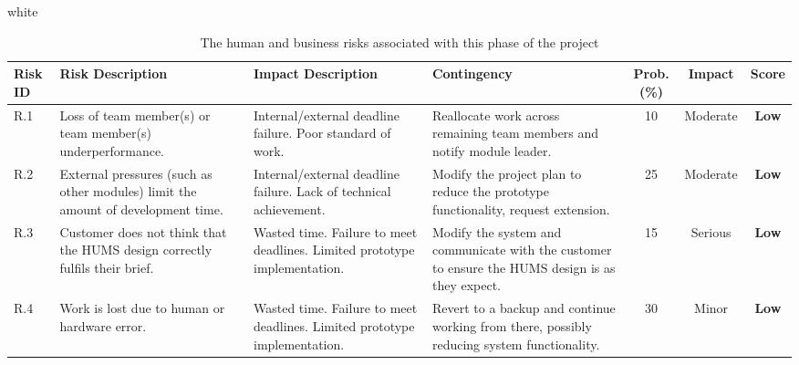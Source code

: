 \documentclass[10pt,a4paper]{article}
\newcommand{\tableformat}[4]{
\begin{table}[H]
\centering
  \rowcolors{2}{gray!10} {white}
\begin{tabular}{#1}
  \hline
  \rowcolor[gray]{0.9} #2
\end{tabular}
\caption{#3}
\label{#4}
\end{table}}
\begin{document}
\tableformat{p{0.8cm} p{3cm} p{3cm} p{3cm} c c c }
{ 	\hline
  	Risk ID & Risk Description & Impact Description & Contingency & Prob.(\%) & Impact & Score \\
  	\hline
  
 	R.1 & Loss of team member(s) or team member(s) underperformance. & Internal/external deadline failure. Poor standard of work. & Reallocate work across remaining team members and notify module leader. & 10 & Moderate & \textbf{Low} \\
   	R.2 & External pressures (such as other modules) limit the amount of development time. & Internal/external deadline failure. Lack of technical achievement. & Modify the project plan to reduce the prototype functionality, request extension. & 25 & Moderate &  \textbf{Low} \\
   	R.3 & Customer does not think that the HUMS design correctly fulfils their brief. & Wasted time. Failure to meet deadlines. Limited prototype implementation. & Modify the system and communicate with the customer to ensure the HUMS design is as they expect. & 15 & Serious &  \textbf{Low} \\
	R.4 & Work is lost due to human or hardware error. & Wasted time. Failure to meet deadlines. Limited prototype implementation. & Revert to a backup and continue working from there, possibly reducing system functionality. & 30 & Minor &  \textbf{Low} \\
  	\hline
}
{The human and business risks associated with this phase of the project}{tab:human_risks}
\end{document}
